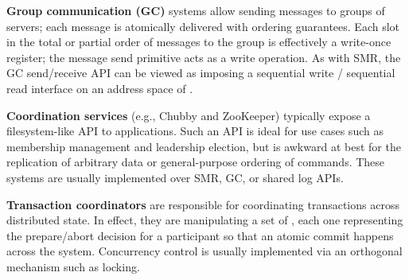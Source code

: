 \textbf{Group communication (GC)} systems allow sending messages to groups of servers; each message is atomically delivered with ordering guarantees. Each slot in the total or partial order of messages to the group is effectively a write-once register; the message send primitive acts as a write operation. As with SMR, the GC send/receive API can be viewed as imposing a sequential write / sequential read interface on an address space of \WORs{}.

\textbf{Coordination services} (e.g., Chubby and ZooKeeper) typically expose a filesystem-like API to applications. Such an API is ideal for use cases such as membership management and leadership election, but is awkward at best for the replication of arbitrary data or general-purpose ordering of commands. These systems are usually implemented over SMR, GC, or shared log APIs. 

\textbf{Transaction coordinators} are responsible for coordinating transactions across distributed state. In effect, they are manipulating a set of \WORs{}, each one representing the prepare/abort decision for a participant so that an atomic commit happens across the system. Concurrency control is usually implemented via an orthogonal mechanism such as locking. 

{}

